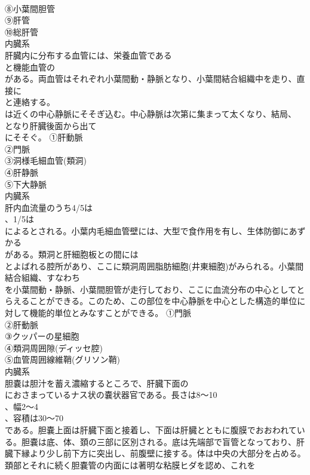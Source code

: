 \documentclass[8pt]{extreport}
\begin{document}
\begin{CJK}{UTF8}{min}
\\	⑧小葉間胆管
\\	⑨肝管
\\	⑩総肝管
\\	内臓系
\\	肝臓内に分布する血管には、栄養血管である
\\	と機能血管の
\\	がある。両血管はそれぞれ小葉間動・静脈となり、小葉間結合組織中を走り、直接に
\\	と連絡する。
\\	は近くの中心静脈にそそぎ込む。中心静脈は次第に集まって太くなり、結局、
\\	となり肝臓後面から出て
\\	にそそぐ。	①肝動脈
\\	②門脈
\\	③洞様毛細血管(類洞)
\\	④肝静脈
\\	⑤下大静脈
\\	内臓系
\\	肝内血流量のうち4/5は
\\	、1/5は
\\	によるとされる。小葉内毛細血管壁には、大型で食作用を有し、生体防御にあずかる
\\	がある。類洞と肝細胞板との間には
\\	とよばれる腔所があり、ここに類洞周囲脂肪細胞(井東細胞)がみられる。小葉間結合組織、すなわち
\\	を小葉間動・静脈、小葉間胆管が走行しており、ここに血流分布の中心としてとらえることができる。このため、この部位を中心静脈を中心とした構造的単位に対して機能的単位とみなすことができる。	①門脈
\\	②肝動脈
\\	③クッパーの星細胞
\\	④類洞周囲隙(ディッセ腔)
\\	⑤血管周囲線維鞘(グリソン鞘)
\\	内臓系
\\	胆嚢は胆汁を蓄え濃縮するところで、肝臓下面の
\\	におさまっているナス状の嚢状器官である。長さは8～10
\\	、幅2～4
\\	、容積は30～70
\\	である。胆嚢上面は肝臓下面と接着し、下面は肝臓とともに腹膜でおおわれている。胆嚢は底、体、頚の三部に区別される。底は先端部で盲管となっており、肝臓下縁より少し前下方に突出し、前腹壁に接する。体は中央の大部分を占める。頚部とそれに続く胆嚢管の内面には著明な粘膜ヒダを認め、これを

\end{CJK}
\end{document}
